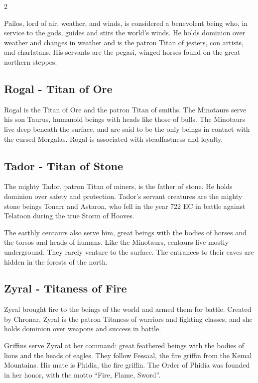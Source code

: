 \begin{multicols}{2}
{Pailos, lord of air, weather, and winds, is considered a benevolent being who, in service to the gods, guides and stirs the world's winds. He holds dominion over weather and changes in weather and is the patron Titan of jesters, con artists, and charlatans. His servants are the pegasi, winged horses found on the great northern steppes.

\subsection{Rogal - Titan of Ore}\label{subsec:rogal-titan-des-erzes}

Rogal is the Titan of Ore and the patron Titan of smiths. The Minotaurs serve his son Taurus, humanoid beings with heads like those of bulls. The Minotaurs live deep beneath the surface, and are said to be the only beings in contact with the cursed Morgalas. Rogal is associated with steadfastness and loyalty.

\subsection{Tador - Titan of Stone}\label{subsec:tador-titan-des-steins}

The mighty Tador, patron Titan of miners, is the father of stone. He holds dominion over safety and protection. Tador's servant creatures are the mighty stone beings Tonarr and Astaron, who fell in the year 722 EC in battle against Telatoon during the true Storm of Hooves.

The earthly centaurs also serve him, great beings with the bodies of horses and the torsos and heads of humans. Like the Minotaurs, centaurs live mostly underground. They rarely venture to the surface. The entrances to their caves are hidden in the forests of the north.

\subsection{Zyral - Titaness of Fire}\label{subsec:zyral-titanin-des-feuers}

Zyral brought fire to the beings of the world and armed them for battle. Created by Chronar, Zyral is the patron Titaness of warriors and fighting classes, and she holds dominion over weapons and success in battle.

Griffins serve Zyral at her command: great feathered beings with the bodies of lions and the heads of eagles. They follow Fessaal, the fire griffin from the Kemal Mountains. His mate is Phidia, the fire griffin. The Order of Phidia was founded in her honor, with the motto ``Fire, Flame, Sword''.

}
\end{multicols}
